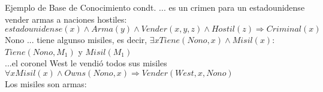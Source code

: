 \begin{frame}{Ejemplo de Base de Conocimiento condt.}
... es un crimen para un estadounidense vender armas a naciones hostiles:
\\\textcolor{DarkPurple}{$estadounidense(x)\wedge Arma(y) \wedge Vender(x,y,z)\wedge Hostil(z)\Rightarrow Criminal(x)$}
\\Nono ... tiene algunso misiles, es decir, $\exists x Tiene(Nono,x) \wedge Misil(x) :$ \textcolor{DarkPurple}{$Tiene(Nono,M_1)$} y \textcolor{DarkPurple}{$Misil(M_1)$}
\\...el coronel West le vendió todos sus misiles   
\textcolor{DarkPurple}{$\forall x Misil(x) \land Owns(Nono,x) \Rightarrow Vender(West,x,Nono)$} 
\\Los misiles son armas:  
\end{frame}

